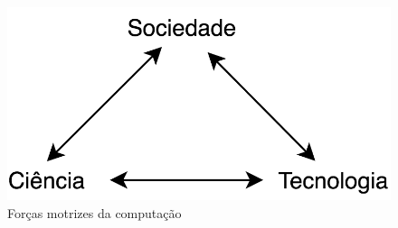 \begin{figure}[htb]
	\caption{Forças motrizes da computação}
	\begin{center}
	    \includegraphics[scale=0.28]{imagens/forcas_motriz.png}
	\end{center}
\end{figure}









